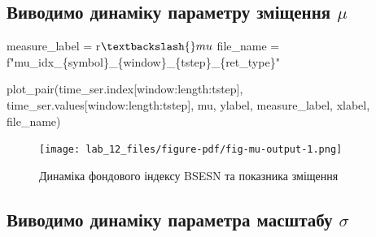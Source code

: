 \documentclass[
  letterpaper,
]{report}
\newenvironment{Shaded}{\begin{snugshade}}{\end{snugshade}}
\newcommand{\NormalTok}[1]{\textcolor[rgb]{0.00,0.23,0.31}{#1}}
\newcommand{\OperatorTok}[1]{\textcolor[rgb]{0.37,0.37,0.37}{#1}}
\newcommand{\SpecialCharTok}[1]{\textcolor[rgb]{0.37,0.37,0.37}{#1}}
\newcommand{\SpecialStringTok}[1]{\textcolor[rgb]{0.13,0.47,0.30}{#1}}
\newcommand{\VerbatimStringTok}[1]{\textcolor[rgb]{0.13,0.47,0.30}{#1}}
\begin{document}
\hypertarget{ux432ux438ux432ux43eux434ux438ux43cux43e-ux434ux438ux43dux430ux43cux456ux43aux443-ux43fux430ux440ux430ux43cux435ux442ux440ux443-ux437ux43cux456ux449ux435ux43dux43dux44f-mu}{%
\subsection{\texorpdfstring{Виводимо динаміку параметру зміщення
\(\mu\)}{Виводимо динаміку параметру зміщення \textbackslash mu}}\label{ux432ux438ux432ux43eux434ux438ux43cux43e-ux434ux438ux43dux430ux43cux456ux43aux443-ux43fux430ux440ux430ux43cux435ux442ux440ux443-ux437ux43cux456ux449ux435ux43dux43dux44f-mu}}

\begin{Shaded}
\begin{Highlighting}[]
\NormalTok{measure\_label }\OperatorTok{=} \VerbatimStringTok{r\textquotesingle{}$\textbackslash{}mu$\textquotesingle{}}
\NormalTok{file\_name }\OperatorTok{=} \SpecialStringTok{f"mu\_idx\_}\SpecialCharTok{\{}\NormalTok{symbol}\SpecialCharTok{\}}\SpecialStringTok{\_}\SpecialCharTok{\{}\NormalTok{window}\SpecialCharTok{\}}\SpecialStringTok{\_}\SpecialCharTok{\{}\NormalTok{tstep}\SpecialCharTok{\}}\SpecialStringTok{\_}\SpecialCharTok{\{}\NormalTok{ret\_type}\SpecialCharTok{\}}\SpecialStringTok{"}
\end{Highlighting}
\end{Shaded}

\begin{Shaded}
\begin{Highlighting}[]
\NormalTok{plot\_pair(time\_ser.index[window:length:tstep],}
\NormalTok{          time\_ser.values[window:length:tstep],}
\NormalTok{          mu, }
\NormalTok{          ylabel, }
\NormalTok{          measure\_label,}
\NormalTok{          xlabel,}
\NormalTok{          file\_name)}
\end{Highlighting}
\end{Shaded}

\begin{figure}[H]

{\centering \texttt{[image: lab\_12\_files/figure-pdf/fig-mu-output-1.png]}

}

\caption{\label{fig-mu}Динаміка фондового індексу BSESN та показника
зміщення}

\end{figure}

\hypertarget{ux432ux438ux432ux43eux434ux438ux43cux43e-ux434ux438ux43dux430ux43cux456ux43aux443-ux43fux430ux440ux430ux43cux435ux442ux440ux430-ux43cux430ux441ux448ux442ux430ux431ux443-sigma}{%
\subsection{\texorpdfstring{Виводимо динаміку параметра масштабу
\(\sigma\)}{Виводимо динаміку параметра масштабу \textbackslash sigma}}\label{ux432ux438ux432ux43eux434ux438ux43cux43e-ux434ux438ux43dux430ux43cux456ux43aux443-ux43fux430ux440ux430ux43cux435ux442ux440ux430-ux43cux430ux441ux448ux442ux430ux431ux443-sigma}}
\end{document}
